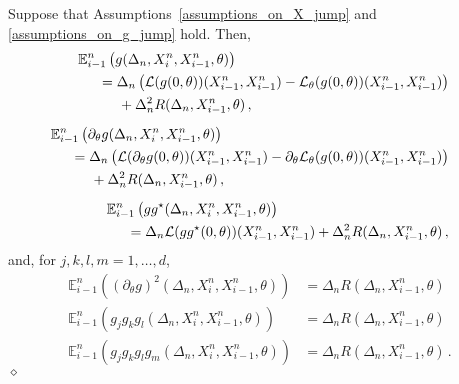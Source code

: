 \documentclass[11pt,a4paper]{article}
\newcommand{\xtl}{{X^n_{i-1}}}
\newcommand{\xtr}{X^n_i}
\newcommand{\EE}{{\mathbb E}}
\renewcommand{\ll}{{\mathcal{L}}}
\newcommand{\dqed}{{\leavevmode \unskip \penalty9999 \hbox{} \nobreak \hfill \quad \hbox{$\diamond$}}}
\numberwithin{equation}{section}
\numberwithin{theorem}{section}
\begin{document}
\begin{lemma}
Suppose that Assumptions~\ref{assumptions_on_X_jump} and
\ref{assumptions_on_g_jump} hold. Then,
\begin{align}
\begin{split}\nonumber
& \hspace{-5mm} \EE^n_{i-1}\left( g(\Delta_n,\xtr, \xtl, \theta) \right)
\\
&= \Delta_n\left( \ll( g(0, \theta) )(\xtl,
  \xtl) - \ll_{\theta}( g(0, \theta) )(\xtl,
  \xtl)\right) \\
&\hspace{5mm}+ \Delta_n^2 R(\Delta_n, \xtl,
\theta) \,,
\end{split}\\[0.5em]
\begin{split}\nonumber
& \hspace{-5mm} \EE^n_{i-1}\left( \partial_{\theta} g(\Delta_n,\xtr, \xtl, \theta)\right) \\
&=\Delta_n \left( \ll(\partial_{\theta}
g(0,\theta))(\xtl,\xtl) - \partial_{\theta} \ll_\theta(g(0,
\theta))(\xtl,\xtl) \right) \\
&\hspace{5mm} + \Delta_n^2 R(\Delta_n,\xtl, \theta)\,,
\end{split}\\[0.5em]
\begin{split}
&\hspace{-5mm} \EE^n_{i-1}\left( gg^\star (\Delta_n,\xtr,\xtl, \theta)
\right) 
\nonumber\\
&= \Delta_n \ll(gg^\star (0,\theta))(\xtl,\xtl)
+ \Delta_n^2 R(\Delta_n,\xtl, \theta)\,,
\end{split}
\end{align}
%
and, for $j,k,l,m=1,\ldots,d$,
\begin{align}
\EE^n_{i-1}\left( \left( \partial_{\theta} g\right)^2(\Delta_n,\xtr, \xtl, \theta)
\right) &= \Delta_n R(\Delta_n, \xtl, \theta) 
\nonumber\\
\EE^n_{i-1}\left( g_jg_kg_l(\Delta_n, \xtr, \xtl, \theta)
\right) &=
\Delta_nR(\Delta_n, \xtl, \theta)\nonumber\\
\EE^n_{i-1}\left( g_jg_kg_lg_m (\Delta_n,\xtr,\xtl,
    \theta) \right) &= \Delta_n R(\Delta_n, \xtl,
\theta)\,.\label{Eg4_jump}
\end{align}
%
\dqed
%
\label{lemma:condexpec}
\end{lemma}
\end{document}
